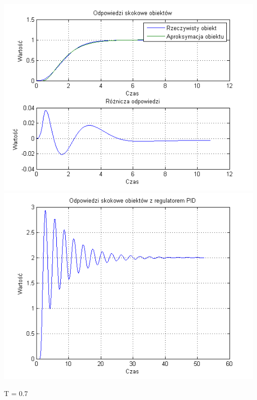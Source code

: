 \documentclass[10pt,a4paper]{article}
\begin{document}
\begin{center}
\includegraphics[scale=1]{images/dwa/skrypt_257.png}\\
\includegraphics[scale=1]{images/dwa/skrypt_258.png}\\
\end{center}
\newpage
T = 0.7
\end{document}
